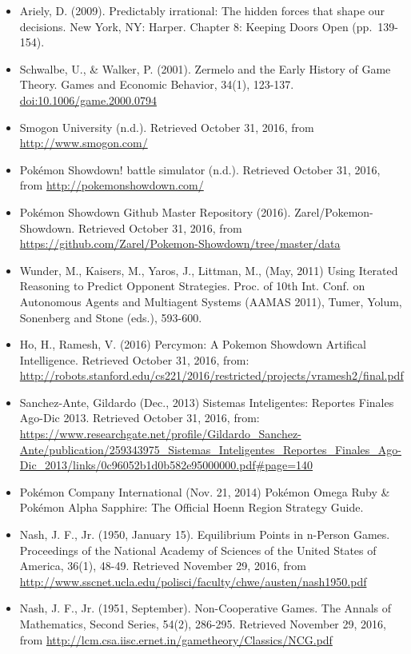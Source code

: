 \documentclass[12pt,twoside]{reedthesis}
\providecommand{\tightlist}{%
  \setlength{\itemsep}{0pt}\setlength{\parskip}{0pt}}
\begin{document}
  \begin{itemize}
  \tightlist
  \item
    Ariely, D. (2009). Predictably irrational: The hidden forces that
    shape our decisions. New York, NY: Harper. Chapter 8: Keeping Doors
    Open (pp.~139-154).
  \item
    Schwalbe, U., \& Walker, P. (2001). Zermelo and the Early History of
    Game Theory. Games and Economic Behavior, 34(1), 123-137.
    \url{doi:10.1006/game.2000.0794}
  \item
    Smogon University (n.d.). Retrieved October 31, 2016, from
    \url{http://www.smogon.com/}
  \item
    Pokémon Showdown! battle simulator (n.d.). Retrieved October 31, 2016,
    from \url{http://pokemonshowdown.com/}
  \item
    Pokémon Showdown Github Master Repository (2016).
    Zarel/Pokemon-Showdown. Retrieved October 31, 2016, from
    \url{https://github.com/Zarel/Pokemon-Showdown/tree/master/data}
  \item
    Wunder, M., Kaisers, M., Yaros, J., Littman, M., (May, 2011) Using
    Iterated Reasoning to Predict Opponent Strategies. Proc. of 10th Int.
    Conf. on Autonomous Agents and Multiagent Systems (AAMAS 2011), Tumer,
    Yolum, Sonenberg and Stone (eds.), 593-600.
  \item
    Ho, H., Ramesh, V. (2016) Percymon: A Pokemon Showdown Artifical
    Intelligence. Retrieved October 31, 2016, from:
    \url{http://robots.stanford.edu/cs221/2016/restricted/projects/vramesh2/final.pdf}
  \item
    Sanchez-Ante, Gildardo (Dec., 2013) Sistemas Inteligentes: Reportes
    Finales Ago-Dic 2013. Retrieved October 31, 2016, from:
    \url{https://www.researchgate.net/profile/Gildardo_Sanchez-Ante/publication/259343975_Sistemas_Inteligentes_Reportes_Finales_Ago-Dic_2013/links/0c96052b1d0b582e95000000.pdf\#page=140}
  \item
    Pokémon Company International (Nov. 21, 2014) Pokémon Omega Ruby \&
    Pokémon Alpha Sapphire: The Official Hoenn Region Strategy Guide.
  \item
    Nash, J. F., Jr. (1950, January 15). Equilibrium Points in n-Person
    Games. Proceedings of the National Academy of Sciences of the United
    States of America, 36(1), 48-49. Retrieved November 29, 2016, from
    \url{http://www.sscnet.ucla.edu/polisci/faculty/chwe/austen/nash1950.pdf}
  \item
    Nash, J. F., Jr. (1951, September). Non-Cooperative Games. The Annals
    of Mathematics, Second Series, 54(2), 286-295. Retrieved November 29,
    2016, from
    \url{http://lcm.csa.iisc.ernet.in/gametheory/Classics/NCG.pdf}
  \end{itemize}
  
\end{document}
